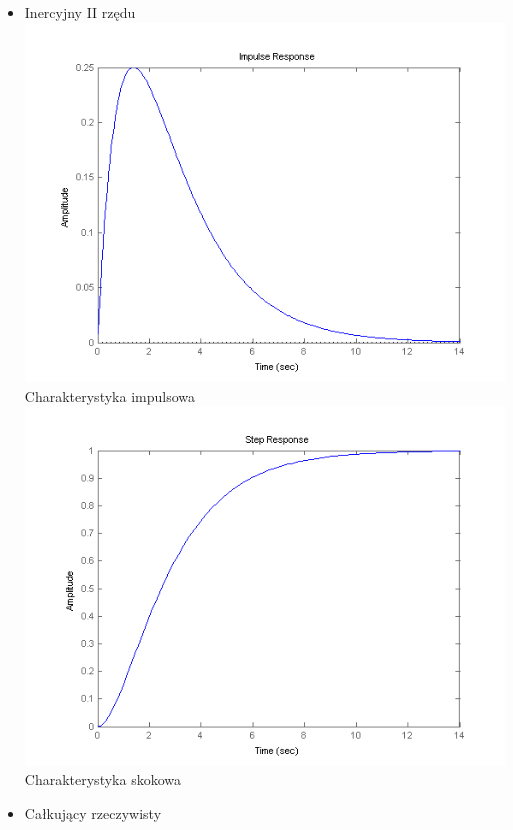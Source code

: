 \documentclass[a4paper,10pt]{article}
\begin{document}
\begin{itemize}
\begin{itemize}
\newpage
\item Inercyjny II rzędu 
\newline \includegraphics[scale=0.9]{CW1-inercyjny2-impuls}\newline Charakterystyka impulsowa
\newline \includegraphics[scale=0.9]{CW1-inercyjny2-skok}\newline Charakterystyka skokowa  
\newpage
\item Całkujący rzeczywisty 

\end{itemize}
\end{itemize}
\end{document}
